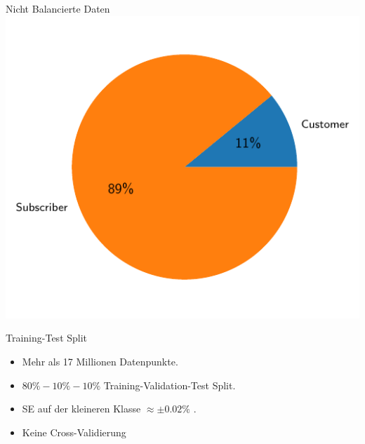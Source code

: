 \begin{frame}{Nicht Balancierte Daten}
\centering
\includegraphics[height=0.9\textheight]{../Images/Piechart}
\end{frame}

\begin{frame}{Training-Test Split}
{
\begin{itemize}
\item Mehr als 17 Millionen Datenpunkte.
\item $80\%-10\%-10\%$ Training-Validation-Test Split.
\item SE auf der kleineren Klasse $\approx \pm 0.02\%$ .
\item Keine Cross-Validierung
\end{itemize}
}
\end{frame}

